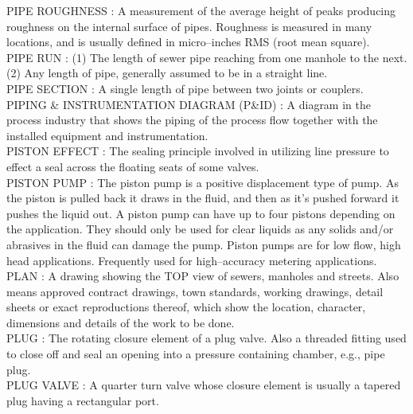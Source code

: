 PIPE ROUGHNESS :   A measurement of the average height of peaks producing roughness on the internal surface of pipes. Roughness is measured in many locations, and is usually defined in micro–inches RMS (root mean square).\\
\vspace{0.15cm}
PIPE RUN :  (1) The length of sewer pipe reaching from one manhole to the next. (2) Any length of pipe, generally assumed to be in a straight line. \\
\vspace{0.15cm}
PIPE SECTION :  A single length of pipe between two joints or couplers. \\
\vspace{0.15cm}
PIPING \& INSTRUMENTATION DIAGRAM (P\&ID) :   A diagram in the process industry that shows the piping of the process flow together with the installed equipment and instrumentation.\\
\vspace{0.15cm}
PISTON EFFECT :   The sealing principle involved in utilizing line pressure to effect a seal across the floating seats of some valves.\\
\vspace{0.15cm}
PISTON PUMP :   The piston pump is a positive displacement type of pump. As the piston is pulled back it draws in the fluid, and then as it’s pushed forward it pushes the liquid out. A piston pump can have up to four pistons depending on the application. They should only be used for clear liquids as any solids and/or abrasives in the fluid can damage the pump. Piston pumps are for low flow, high head applications. Frequently used for high–accuracy metering applications.\\
\vspace{0.15cm}
PLAN :  A drawing showing the TOP view of sewers, manholes and streets. Also means approved contract drawings, town standards, working drawings, detail sheets or exact reproductions thereof, which show the location, character, dimensions and details of the work to be done. \\
\vspace{0.15cm}
PLUG :   The rotating closure element of a plug valve. Also a threaded fitting used to close off and seal an opening into a pressure containing chamber, e.g., pipe plug.\\
\vspace{0.15cm}
PLUG VALVE :   A quarter turn valve whose closure element is usually a tapered plug having a rectangular port.\\
